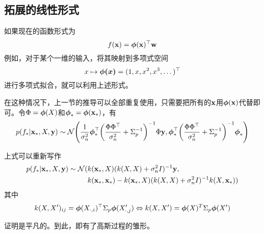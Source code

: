 \documentclass[12pt,UTF8]{article}
\begin{document}
        \subsection{拓展的线性形式}
            如果现在的函数形式为
            \begin{equation}
                f(\vb{x})=\vb*{\phi}(\vb{x})^\top\vb{w}
            \end{equation}
            例如，对于某个一维的输入，将其映射到多项式空间
            \begin{equation}
                x\mapsto\vb*{\phi(x)}=(1,x,x^2,x^3,\dots)^\top
            \end{equation}
            进行多项式拟合，就可以利用上述形式。\par
            在这种情况下，上一节的推导可以全部重复使用，只需要把所有的$\vb{x}$用$\vb*{\phi}(\vb{x})$代替即可。令$\Phi=\vb*{\phi}(X)$和$\vb*{\phi}_*=\vb*{\phi}(\vb{x}_*)$，有
            \begin{equation}
                p(f_*|\vb{x}_*,X,\vb{y})\sim\mathcal{N}\qty(\frac{1}{\sigma_n^2}\vb*{\phi}_*^\top\qty(\frac{\Phi\Phi^\top}{\sigma_n^2}+\Sigma_p^{-1})^{-1}\Phi\vb{y},\vb*{\phi}_*^\top\qty(\frac{\Phi\Phi^\top}{\sigma_n^2}+\Sigma_p^{-1})^{-1}\vb*{\phi}_*)
            \end{equation}\par
            上式可以重新写作
            \begin{align}
                p(f_*|\vb{x}_*,X,\vb{y})\sim\mathcal{N}(&k(\vb{x}_*,X)(k(X,X)+\sigma_n^2I)^{-1}\vb{y},\nonumber \\
                &k(\vb{x}_*,\vb{x}_*)-k(\vb{x}_*,X)(k(X,X)+\sigma_n^2I)^{-1}k(X,\vb{x}_*))
            \end{align}
            其中
            \begin{equation}
                k(X,X')_{ij}=\vb*{\phi}(X_{\cdot,i})^\top\Sigma_p\vb*{\phi}(X'_{\cdot,j})\Leftrightarrow k(X,X')=\vb*{\phi}(X)^T\Sigma_p\vb*{\phi}(X')
            \end{equation}\par
            证明是平凡的。到此，即有了高斯过程的雏形。
\end{document}
